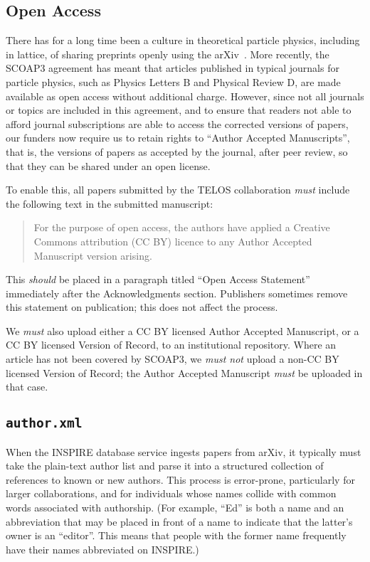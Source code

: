 \documentclass{article}
\newcommand\rfcword[1]{\emph{#1}\xspace}
\newcommand\must{\rfcword{must}}
\newcommand\mustnot{\rfcword{must not}}
\newcommand\should{\rfcword{should}}
\newcommand\filename[1]{\texttt{#1}\xspace}
\newcommand\authorxml{\filename{author.xml}}
\begin{document}
\subsection{Open Access}

There has for a long time been a culture in theoretical particle physics,
including in lattice,
of sharing preprints openly using the arXiv~\cite{ginsparg2021lessons}.
More recently,
the SCOAP3 agreement has meant that
articles published in
typical journals for particle physics,
such as Physics Letters B and Physical Review D,
are made available as open access without additional charge.
However,
since not all journals or topics are included in this agreement,
and to ensure
that readers not able to afford journal subscriptions
are able to access the corrected versions of papers,
our funders now require us to retain rights to
``Author Accepted Manuscripts'',
that is,
the versions of papers as accepted by the journal,
after peer review,
so that they can be shared under an open license.

To enable this,
all papers submitted by the TELOS collaboration
\must include the following text in the submitted manuscript:

\begin{quote}
  For the purpose of open access,
  the authors have applied a Creative Commons attribution (CC BY) licence
  to any Author Accepted Manuscript version arising.
\end{quote}

This \should be placed in a paragraph titled
``Open Access Statement''
immediately after the Acknowledgments section.
Publishers sometimes remove this statement on publication;
this does not affect the process.

We \must also upload either a CC BY licensed Author Accepted Manuscript,
or a CC BY licensed Version of Record,
to an institutional repository.
Where an article has not been covered by SCOAP3,
we \mustnot upload a non-CC BY licensed Version of Record;
the Author Accepted Manuscript \must be uploaded in that case.


\subsection{\authorxml}

When the INSPIRE database service ingests papers from arXiv,
it typically must take the plain-text author list
and parse it into a structured collection of references to known or new authors.
This process is error-prone,
particularly for larger collaborations,
and for individuals whose names collide with common words associated with authorship.
(For example,
``Ed'' is both a name
and an abbreviation that may be placed in front of a name
to indicate that the latter's owner is an ``editor''.
This means that people with the former name frequently have their names abbreviated on INSPIRE.)
\end{document}

